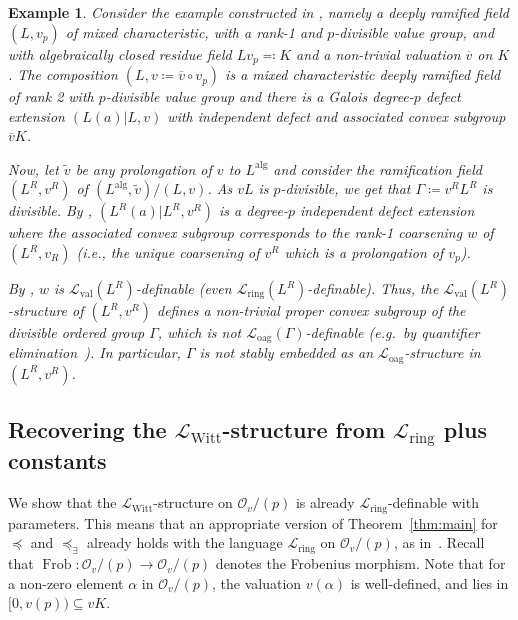\documentclass[a4paper]{amsart}
\theoremstyle{mystyle2}
\theoremstyle{mystyle}
\newtheorem{examp}[thm]{Example}
\DeclareMathOperator{\Frob}{Frob}
\renewcommand{\L}{\mathcal{L}}
\newcommand{\Lring}{\L_{\mathrm{ring}}}
\newcommand{\Loag}{\L_{\mathrm{oag}}}
\newcommand{\Lval}{\L_{\mathrm{val}}}
\newcommand{\LWitt}{\L_{\mathrm{Witt}}}
\renewcommand{\O}{\mathcal{O}}
\numberwithin{equation}{section}
\begin{document}
    \begin{examp}
    	Consider the example constructed in \cite[Example~6.10]{Kuh25}, namely a 
        deeply ramified field \( (L,v_p) \) of mixed characteristic, with a rank-1 and \( p \)-divisible value group, and with algebraically closed residue field \( Lv_p\eqqcolon K \) and a non-trivial valuation \( \overline v \) on \( K \). 
    	The composition \( (L,v\coloneqq \overline v \circ v_p) \) is a mixed characteristic deeply ramified field of rank 2 with \( p \)-divisible value group
        and there is a Galois degree-\( p \) defect extension \( (L(a)|L,v) \) with independent defect and associated convex subgroup \( \overline v K \).
    	
    	
    	Now, let $\tilde{v}$ be any prolongation of $v$ to $L^\mathrm{alg}$ and consider the ramification field \( (L^R,v^R) \) of \( (L^\mathrm{alg},\tilde{v})/(L,v) \). 
    	As \( vL \) is \( p \)-divisible, we get that \( \Gamma\coloneqq v^RL^R \) is divisible.
    	By \cite[Proposition~3.8]{KuhlBla}, \( (L^R(a)|L^R,v^R) \) is a degree-\( p \) independent defect extension where the associated convex subgroup corresponds to the rank-1 coarsening \( w \) of \( (L^R,v_R) \) (i.e., the unique coarsening of $v^R$ which is a prolongation of $v_p$).
    	
        By \cite[Theorem~4.11]{KRS}, $w$ is $\Lval(L^R)$-definable (even $\Lring(L^R)$-definable). Thus, the $\Lval(L^R)$-structure of $(L^R,v^R)$
        defines a non-trivial proper convex subgroup of the divisible ordered group $\Gamma$, which is not $\Loag(\Gamma)$-definable (e.g.\ by quantifier elimination~\cite[Corollary~3.1.17]{Mar}). In particular,
        $\Gamma$ is not stably embedded as an $\Loag$-structure in $(L^R,v^R)$.
    \end{examp}
    
    \subsection{Recovering the $\LWitt$-structure from $\Lring$ plus constants}

    We show that the $\LWitt$-structure on $\O_v/(p)$ is already $\Lring$-definable with parameters.
    This means that an appropriate version of Theorem~\ref{thm:main} for 
    $\preceq$ and $\preceq_{\exists}$ already holds with the language $\Lring$ on $\O_v/(p)$, as in~\cite[Thm.\,1.7.3]{jahnke-kartas2023beyond}.
    Recall that $\Frob\colon \O_v/(p)\to \O_v/(p)$ denotes the Frobenius morphism. 
    Note that for a non-zero element $\alpha$ in $\O_v/(p)$, the valuation $v(\alpha)$ is well-defined, and lies in $[0,v(p))\subseteq vK$.
\end{document}
